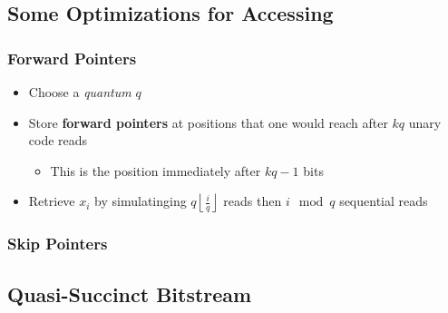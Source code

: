 \documentclass[10pt]{article}
\begin{document}
\subsection{Some Optimizations for Accessing}\label{optimizations}

\subsubsection{Forward Pointers}\label{forward-pointers}
\begin{itemize}
\item
    Choose a \textit{quantum} \(q\)
\item
    Store \textbf{forward pointers} at positions that one would reach after 
    \(kq\) unary code reads
    \begin{itemize}
    \item
        This is the position immediately after \(kq - 1\) bits
    \end{itemize}
\item
    Retrieve \(x_i\) by simulatinging \(q \left \lfloor \frac{i}{q} \right \rfloor\) reads
    then \(i \mod q\) sequential reads
\end{itemize}
\subsubsection{Skip Pointers}\label{skip-pointers}

\subsection{Quasi-Succinct Bitstream}\label{quasi-succinct-bitstream}
\end{document}
